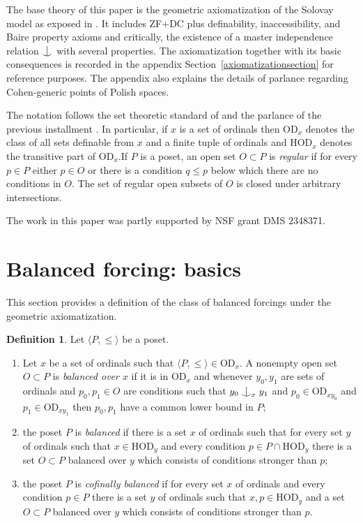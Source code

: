 \documentclass{article}
\newcommand{\hvd}{\mathrm{HOD}}
\newcommand{\vd}{\mathrm{OD}}
\newcommand{\forkindep}[1][]{%
  \mathrel{
    \mathop{
      \vcenter{
        \hbox{\oalign{\noalign{\kern-.3ex}\hfil$\vert$\hfil\cr
              \noalign{\kern-.7ex}
              $\smile$\cr\noalign{\kern-.3ex}}}
      }
    }\displaylimits_{#1}
  }
}
\theoremstyle{definition}
\newtheorem{definition}[theorem]{Definition}
\begin{document}
The base theory of this paper is the geometric axiomatization of the Solovay model as exposed in \cite{z:reloadedA}. It includes ZF+DC plus definability, inaccessibility, and Baire property axioms and critically, the existence of a master independence relation $\forkindep$ with several properties. The axiomatization together with its basic consequences is recorded in the appendix Section~\ref{axiomatizationsection} for reference purposes. The appendix also explains the details of parlance regarding Cohen-generic points of Polish spaces.


The notation follows the set theoretic standard of \cite{jech:newset} and the parlance of the previous installment \cite{z:reloadedA}. In particular, if $x$ is a set of ordinals then $\vd_x$ denotes the class of all sets definable from $x$ and a finite tuple of ordinals and $\hvd_x$ denotes the transitive part of $\vd_x$.If $P$ is a poset, an open set $O\subset P$ is \emph{regular} if for every $p\in P$ either $p\in O$ or there is a condition $q\leq p$ below which there are no conditions in $O$. The set of regular open subsets of $O$ is closed under arbitrary intersections. 

The work in this paper was partly supported by NSF grant  DMS 2348371.



\section{Balanced forcing: basics}
\label{balancedsection}

This section provides a definition of the class of balanced forcings under the geometric axiomatization.

\begin{definition}
Let $\langle P, \leq\rangle$ be a poset.

\begin{enumerate}
\item Let $x$ be a set of ordinals such that $\langle P, \leq\rangle\in \vd_x$. A nonempty open set $O\subset P$ is \emph{balanced over $x$} if it is in $\vd_x$ and whenever $y_0, y_1$ are sets of ordinals and $p_0, p_1\in O$ are conditions such that $y_0\forkindep[x]y_1$ and $p_0\in\vd_{xy_0}$ and $p_1\in\vd_{xy_1}$ then $p_0, p_1$ have a common lower bound in $P$;
\item the poset $P$ is \emph{balanced} if there is a set $x$ of ordinals such that for every set $y$ of ordinals such that $x\in\hvd_y$ and every condition $p\in P\cap\hvd_y$ there is a set $O\subset P$ balanced over $y$ which consists of conditions stronger than $p$;
\item the poset $P$ is \emph{cofinally balanced} if for every set $x$ of ordinals and every condition $p\in P$ there is a set $y$ of ordinals such that $x, p\in\hvd_y$ and a set $O\subset P$ balanced over $y$ which consists of conditions stronger than $p$.
\end{enumerate}
\end{definition}
\end{document}
